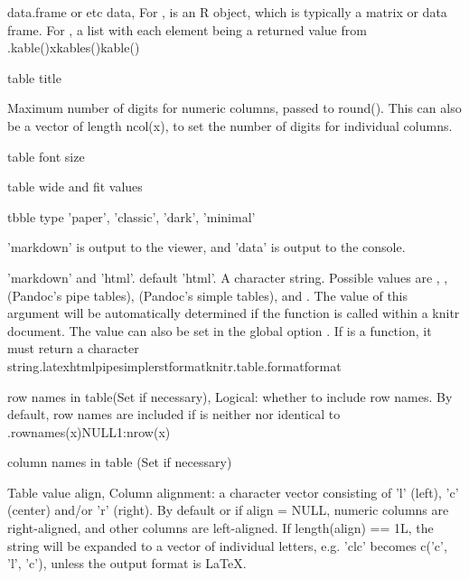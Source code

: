 \documentclass[a4paper]{book}
\begin{document}
%
\begin{Arguments}
\begin{ldescription}
\item[\code{data}] data.frame or etc data, For , is an R object, which is typically a matrix or data frame. For , a list with each element being a returned value from .kable()xkables()kable()

\item[\code{caption}] table title

\item[\code{digits}] Maximum number of digits for numeric columns, passed to round(). This can also be a vector of length ncol(x), to set the number of digits for individual columns.

\item[\code{font\_size}] table font size

\item[\code{full\_width}] table wide and fit values

\item[\code{table}] tbble type 'paper', 'classic', 'dark', 'minimal'

\item[\code{show}] 'markdown' is output to the viewer, and 'data' is output to the console.

\item[\code{format}] 'markdown' and 'html'. default 'html'. A character string. Possible values are , , (Pandoc's pipe tables), (Pandoc's simple tables), and . The value of this argument will be automatically determined if the function is called within a knitr document. The value can also be set in the global option . If is a function, it must return a character string.latexhtmlpipesimplerstformatknitr.table.formatformat

\item[\code{row.names}] row names in table(Set if necessary), Logical: whether to include row names. By default, row names are included if is neither nor identical to .rownames(x)NULL1:nrow(x)

\item[\code{col.names}] column names in table (Set if necessary)

\item[\code{align}] Table value align, Column alignment: a character vector consisting of 'l' (left), 'c' (center) and/or 'r' (right). By default or if align = NULL, numeric columns are right-aligned, and other columns are left-aligned. If length(align) == 1L, the string will be expanded to a vector of individual letters, e.g. 'clc' becomes c('c', 'l', 'c'), unless the output format is LaTeX.


\end{ldescription}
\end{Arguments}
\end{document}
